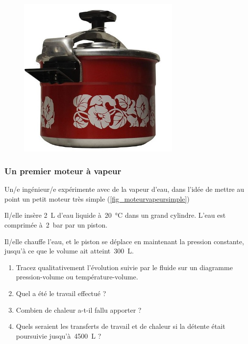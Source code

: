 	\begin{figure}[htp] %
		\begin{center}
			\includegraphics[width=8cm]{images/exercice_super_cocotte}
		\end{center}
		\label{fig_cocotte}
	\end{figure}


\subsubsection{Un premier moteur à vapeur}

	Un/e ingénieur/e expérimente avec de la vapeur d’eau, dans l’idée de mettre au point un petit moteur très simple (\cref{fig_moteurvapeursimple})
	
	Il/elle insère \SI{2}{\liter} d’eau liquide à~\SI{20}{\degreeCelsius} dans un grand cylindre. L’eau est comprimée à~\SI{2}{\bar} par un piston.
	
	Il/elle chauffe l’eau, et le piston se déplace en maintenant la pression constante, jusqu’à ce que le volume ait atteint~\SI{300}{\liter}.
	
	\begin{enumerate}
		\item Tracez qualitativement l’évolution suivie par le fluide sur un diagramme pression-volume ou température-volume.
		\item Quel a été le travail effectué ?
		\item Combien de chaleur a-t-il fallu apporter ?
		\item Quels seraient les transferts de travail et de chaleur si la détente était poursuivie jusqu’à~\SI{4500}{\liter} ?
	\end{enumerate}

